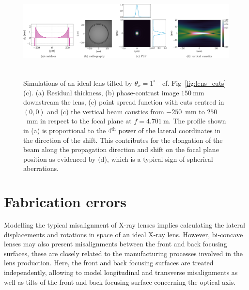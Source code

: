 \begin{refsection}
\begin{figure}[t]
        {\includegraphics[height=4.19cm]{figures/ch04/tilted_CRL.pdf}}
        \caption[Effects of a CRL tilt]{Simulations of an ideal lens tilted by $\theta_x=1^{\circ}$ - cf. Fig~\ref{fig:lens_cuts}(c). (a) Residual thickness, (b) phase-contrast image $150~$mm downstream the lens, (c) point spread function with cuts centred in $(0,0)$ and (c) the vertical beam caustics from $-250$~mm to $250$~mm in respect to the focal plane at $f=4.701~$m. The profile shown in (a) is proportional to the 4$^{\text{th}}$ power of the lateral coordinates in the direction of the shift. This contributes for the elongation of the beam along the propagation direction and shift on the focal plane position as evidenced by (d), which is a typical sign of spherical aberrations.} \label{fig:tilted_CRL}
\end{figure}
\section{Fabrication errors}\label{sec:fabrication}

Modelling the typical misalignment of X-ray lenses implies calculating the lateral displacements and rotations in space of an ideal X-ray lens. However, bi-concave lenses may also present misalignments between the front and back focusing surfaces, these are closely related to the manufacturing processes involved in the lens production. Here, the front and back focusing surfaces are treated independently, allowing to model longitudinal and transverse misalignments as well as tilts of the front and back focusing surface concerning the optical axis.



\end{refsection}
